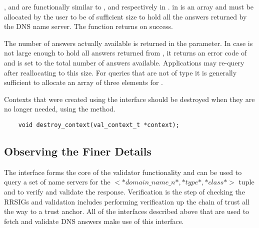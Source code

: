 ,  and  are functionally similar 
to ,  and  respectively in .
 in  is an array and must be allocated by the user to be of sufficient
size to hold all the answers returned by the DNS name server.
The  function returns  on success.
                                                                                                                             
The number of answers actually available is returned in the 
parameter.  In case  is not large enough to hold all answers
returned from , it returns an error code of 
 and  is set to the total number of 
answers available.  Applications may re-query after reallocating  
to this size. For queries that are not of type  it is generally sufficient
to allocate an array of three elements for .
                                                                                                                             
Contexts that were created using the  interface should be
destroyed when they are no longer needed, using the 
method.

\begin{verbatim}
    void destroy_context(val_context_t *context);
\end{verbatim}
                                                                                                                             

\subsection{Observing the Finer Details}
\label{detail}
                                                                                                                             
The  interface forms the core of the 
validator functionality and can be used to query a set of name servers 
for the $<*domain\_name\_n*, *type*, *class*>$ tuple and to verify and
validate the response.  Verification is the step of checking the RRSIGs
and validation includes performing verification up the chain of trust
all the way to a trust anchor.
All of the interfaces described above that are used to fetch and
validate DNS answers make use of this interface.


